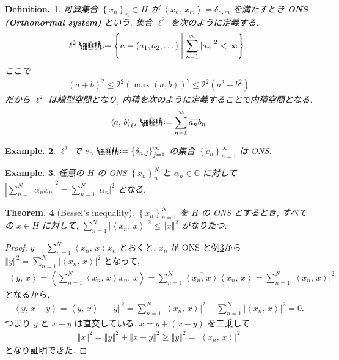 \documentclass[openany, a4paper, oneside]{jsbook}
\makeatletter
\newcommand*{\defeq}{\mathrel{\rlap{%
\raisebox{0.3ex}{$\m@th\cdot$}}%
\raisebox{-0.3ex}{$\m@th\cdot$}}%
=}
\theoremstyle{break}
\theoremstyle{breakdefn}
\newtheorem{thm}{Theorem.}[section]
\newtheorem{defn}[thm]{Definition.}
\newtheorem{ex}[thm]{Example.}
\newcommand{\abs}[1]{\left|#1\right|}
\newcommand{\norm}[1]{\left\Vert#1\right\Vert}
\newcommand{\rbk}[1]{\left (#1\right)}
\newcommand{\cbk}[1]{\left\{#1\right\}}
\newcommand{\bkt}[2]{\left\langle#1,\,#2\right\rangle}
\newcommand{\relmiddle}[1]{\mathrel{}\middle#1\mathrel{}}
\newcommand{\set}[2]{\left\{#1 \relmiddle| #2\right\}}
\newcommand{\bbC}{\mathbb{C}}
\newcommand{\upbf}[1]{\textup{\textbf{#1}}}
\makeatother
\begin{document}
\begin{defn}
 可算集合 $\cbk{x_n}_{n} \subset H$ が $\bkt{x_n}{x_m} = \delta_{n,m} $ を満たすとき \upbf{ONS (Orthonormal system)} という.
 集合 $\ell^2$ を次のように定義する.
 \begin{align}
  \ell^2
  \defeq
  \set{a = \rbk{a_1, a_2, \dots}}{\sum_{n=1}^{\infty} \abs{a_n}^2 < \infty}.
 \end{align}
 ここで
 \begin{align}
  (a+b)^2
  \leq
  2^2 \rbk{\max (a,b)}^2
  \leq
  2^2 (a^2 + b^2)
 \end{align}
 だから $\ell^2$ は線型空間となり,
 内積を次のように定義することで内積空間となる.
 \begin{align}
  \bkt{a}{b}_{\ell^2}
  \defeq
  \sum_{n = 1}^\infty \overline{a_{n}}b_{n}
 \end{align}
\end{defn}
\begin{ex}
 $\ell^2$ で $e_{n} \defeq \cbk{\delta_{n,j}}_{j = 1}^\infty$ の集合 $\cbk{e_{n}}_{n=1}^\infty$ は ONS.
\end{ex}
\begin{ex}\label{functional_analysis_hilbert_space_yukimi_ons}
 任意の $H$ の ONS $\cbk{x_{n}}_{n}^N$ と $\alpha_{n} \in \bbC$ に対して
 $\abs{\sum_{n = 1}^N \alpha_{n} x_{n}}^2 = \sum_{n = 1}^N \abs{\alpha_{n}}^2$ となる.
\end{ex}

\begin{thm}[Bessel's inequality]\label{functional_analysis_hilbert_space_yukimi_Bessel}
 $\cbk{x_{n}}_{n = 1}^N$ を $H$ の ONS とするとき,
 すべての $x \in H$ に対して, $\sum_{n=1}^N \abs{\bkt{x_n}{x}}^2 \leq \norm{x}^2$ がなりたつ.
\end{thm}
\begin{proof}
$y = \sum_{n=1}^N \bkt{x_n}{x} x_{n}$ とおくと,
$x_{n}$ が ONS と例\ref{functional_analysis_hilbert_space_yukimi_ons}から
$\norm{y}^2 = \sum_{n=1}^N \abs{\bkt{x_n}{x}}^2$ となって,
\begin{align}
 \bkt{y}{x}
 =
 \bkt{\sum_{n=1}^N \bkt{x_n}{x} x_n}{x}
 =
 \sum_{n=1}^N \overline{\bkt{x_n}{x}} \bkt{x_n}{x}
 =
 \sum_{n=1}^N \abs{\bkt{x_n}{x}}^2
\end{align}
となるから,
\begin{align}
 \bkt{y}{x - y}
 =
 \bkt{y}{x} - \norm{y}^2
 =
 \sum_{n=1}^N \abs{\bkt{x_n}{x}}^2 - \sum_{n=1}^N \abs{\bkt{x_n}{x}}^2
 = 0.
\end{align}
つまり $y$ と $x-y$ は直交している.
$x = y + (x-y)$ を二乗して
\begin{align}
 \norm{x}^2
 =
 \norm{y}^2 + \norm{x - y}^2
 \geq
 \norm{y}^2
 =
 \abs{\bkt{x_n}{x}}^2
\end{align}
となり証明できた.
\end{proof}
\end{document}

